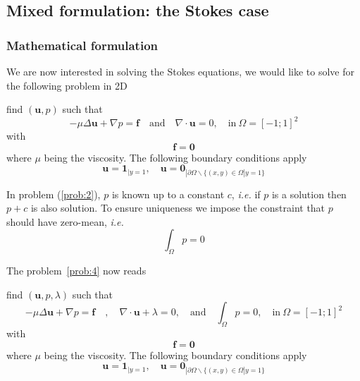 \subsection{Mixed formulation: the Stokes case}
\label{sec:mixed-form-stok}
\subsubsection{Mathematical formulation}
\label{sec:math-form}

  We are now interested in solving
the Stokes equations, we would like to solve for the following problem
in 2D
\begin{problem}
\label{prob:4}
 find $(\mathbf{u},p)$ such that
\begin{equation}
  \label{eq:22}
  - \mu \Delta \mathbf{u} +\nabla p = \mathbf{f}\quad \text{and}\quad \nabla \cdot \mathbf{u} = 0,\quad \text{in}\ \Omega = [-1;1]^2
\end{equation}
with
\begin{equation}
  \label{eq:24}
  \mathbf{f} = \mathbf{0}
\end{equation}
where $\mu$ being the viscosity. The following boundary conditions apply
\begin{equation}
  \label{eq:23}
  \mathbf{u}=\mathbf{1}_{|y=1}, \quad \mathbf{u}=\mathbf{0}_{|\partial \Omega \backslash \{(x,y) \in \Omega | y=1\}}
\end{equation}
\end{problem}

In problem (\ref{prob:2}), $p$ is known up to a constant $c$,
\emph{i.e.} if $p$ is a solution then $p+c$ is also solution. To
ensure uniqueness we impose the constraint that $p$ should have
zero-mean, \emph{i.e.}
\begin{equation}
  \label{eq:26}
  \int_\Omega p = 0
\end{equation}

The problem~\ref{prob:4} now reads
\begin{problem}
  \label{prob:5}
 find $(\mathbf{u},p,\lambda)$ such that
\begin{equation}
  \label{eq:34}
  - \mu \Delta \mathbf{u} +\nabla p = \mathbf{f}\quad, \quad \nabla \cdot \mathbf{u} + \lambda = 0, \quad \text{and}\quad \int_\Omega p = 0,\quad \text{in}\ \Omega = [-1;1]^2
\end{equation}
with
\begin{equation}
  \label{eq:35}
  \mathbf{f} = \mathbf{0}
\end{equation}
where $\mu$ being the viscosity. The following boundary conditions apply
\begin{equation}
  \label{eq:36}
  \mathbf{u}=\mathbf{1}_{|y=1}, \quad \mathbf{u}=\mathbf{0}_{|\partial \Omega \backslash \{(x,y) \in \Omega | y=1\}}
\end{equation}
\end{problem}


